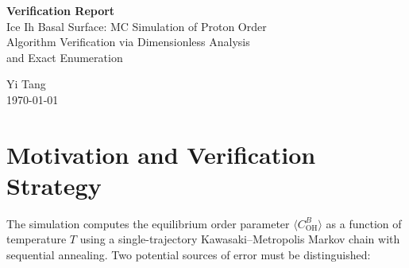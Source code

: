 \documentclass[12pt, a4paper]{article}
\theoremstyle{plain}
\theoremstyle{definition}
\newcommand{\COH}{C_\mathrm{OH}^B}
\newcommand{\eps}{\varepsilon}
\newcommand{\kB}{k_{\mathrm{B}}}
\newcommand{\Tstar}{T^*}
\newcommand{\avgE}[1]{\langle #1 \rangle}
\begin{document}

\begin{titlepage}
\centering
\vspace*{2cm}
{\LARGE\bfseries Verification Report}\\[0.8em]
{\large Ice Ih Basal Surface: MC Simulation of Proton Order}\\[0.5em]
{\normalsize Algorithm Verification via Dimensionless Analysis\\
and Exact Enumeration}
\vspace{1.5cm}

{\large Yi Tang}\\[0.4em]
{\normalsize \today}

\vspace{2cm}
\end{titlepage}

\tableofcontents
\newpage

\section{Motivation and Verification Strategy}

The simulation computes the equilibrium order parameter
$\avgE{\COH}$ as a function of temperature $T$ using a single-trajectory
Kawasaki--Metropolis Markov chain with sequential annealing.
Two potential sources of error must be distinguished:
\end{document}
